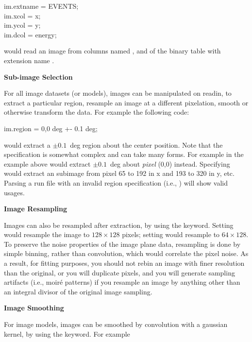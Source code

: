 \begin{myindentpar}{3cm}
im.extname = EVENTS;\\
im.xcol = x;\\
im.ycol = y;\\
im.dcol = energy;
\end{myindentpar}

would read an image from columns named ,  and
 of the binary table with extension name .

{\bf Sub-image Selection}

For all image datasets (or models), images can be manipulated on
readin, to extract a particular region, resample an image at a
different pixelation, smooth or otherwise transform the data.  For
example the following code:

\begin{myindentpar}{3cm}
im.region = 0,0 deg +- 0.1 deg;\\
\end{myindentpar}

would extract a $\pm 0.1$~deg region about the center position.  Note
that the  specification is somewhat complex and can take
many forms.  For example  in the
example above would extract $\pm 0.1$~deg about {\it pixel} (0,0)
instead.  Specifying  would extract an
subimage from pixel 65 to 192 in x and 193 to 320 in y, etc.  Parsing
a run file with an invalid region specification (i.e., ) will show valid usages.

{\bf Image Resampling}

Images can also be resampled after extraction, by using the
 keyword.  Setting  would resample the
image to $128\times128$ pixels; setting 
would resample to $64\times128$.  To preserve the noise properties of
the image plane data, resampling is done by simple binning, rather
than convolution, which would correlate the pixel noise.  As a result,
for fitting purposes, you should not rebin an image with finer
resolution than the original, or you will duplicate pixels, and you
will generate sampling artifacts (i.e., moir\'e patterns) if you
resample an image by anything other than an integral divisor of the
original image sampling.

{\bf Image Smoothing}

For image models, images can be smoothed by convolution with a
gaussian kernel, by using the  keyword.  For example

